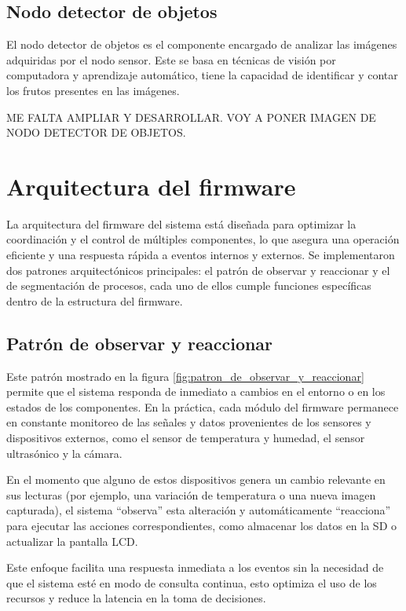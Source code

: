 \subsection{Nodo detector de objetos}

El nodo detector de objetos es el componente encargado de analizar las imágenes adquiridas por el nodo sensor. Este se basa en técnicas de visión por computadora y aprendizaje automático, tiene la capacidad de identificar y contar los frutos presentes en las imágenes. 

ME FALTA AMPLIAR Y DESARROLLAR. VOY A PONER IMAGEN DE NODO DETECTOR DE OBJETOS.

\section{Arquitectura del firmware}

La arquitectura del firmware del sistema está diseñada para optimizar la coordinación y el control de múltiples componentes, lo que asegura una operación eficiente y una respuesta rápida a eventos internos y externos. Se implementaron dos patrones arquitectónicos principales: el patrón de observar y reaccionar y el de segmentación de procesos, cada uno de ellos cumple funciones específicas dentro de la estructura del firmware.

\subsection{Patrón de observar y reaccionar}

Este patrón mostrado en la figura \ref{fig:patron_de_observar_y_reaccionar} permite que el sistema responda de inmediato a cambios en el entorno o en los estados de los componentes. En la práctica, cada módulo del firmware permanece en constante monitoreo de las señales y datos provenientes de los sensores y dispositivos externos, como el sensor de temperatura y humedad, el sensor ultrasónico y la cámara. 

En el momento que alguno de estos dispositivos genera un cambio relevante en sus lecturas (por ejemplo, una variación de temperatura o una nueva imagen capturada), el sistema ``observa'' esta alteración y automáticamente ``reacciona'' para ejecutar las acciones correspondientes, como almacenar los datos en la SD o actualizar la pantalla LCD. 

Este enfoque facilita una respuesta inmediata a los eventos sin la necesidad de que el sistema esté en modo de consulta continua, esto optimiza el uso de los recursos y reduce la latencia en la toma de decisiones.

